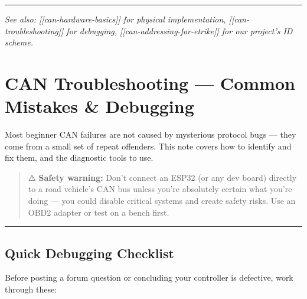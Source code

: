 \documentclass[12pt,a4paper,oneside]{report}
\begin{document}
\begin{center}\rule{0.5\linewidth}{0.5pt}\end{center}

\emph{See also: {[}{[}can-hardware-basics{]}{]} for physical implementation,
{[}{[}can-troubleshooting{]}{]} for debugging,
{[}{[}can-addressing-for-etrike{]}{]} for our project's ID scheme.}


\chapter{CAN Troubleshooting --- Common Mistakes \&
Debugging}\label{can-troubleshooting-common-mistakes-debugging}

Most beginner CAN failures are not caused by mysterious protocol bugs --- they
come from a small set of repeat offenders. This note covers how to identify and
fix them, and the diagnostic tools to use.

\begin{quote}
⚠️ \textbf{Safety warning:} Don't connect an ESP32 (or any dev board) directly
to a road vehicle's CAN bus unless you're absolutely certain what you're doing
--- you could disable critical systems and create safety risks. Use an OBD2
adapter or test on a bench first.
\end{quote}

\begin{center}\rule{0.5\linewidth}{0.5pt}\end{center}

\section{Quick Debugging Checklist}\label{quick-debugging-checklist}

Before posting a forum question or concluding your controller is defective, work
through these:
\end{document}

